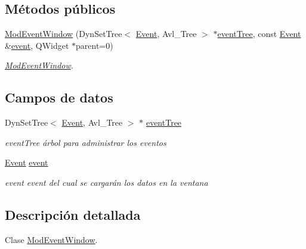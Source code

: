 \subsection*{Métodos públicos}
\begin{DoxyCompactItemize}
\item 
\hyperlink{class_mod_event_window_af4786249a6a84874d00927b9fc956f9c}{Mod\+Event\+Window} (Dyn\+Set\+Tree$<$ \hyperlink{class_event}{Event}, Avl\+\_\+\+Tree $>$ $\ast$\hyperlink{class_mod_event_window_afe17e39631e29b25a5442bfa41575dce}{event\+Tree}, const \hyperlink{class_event}{Event} \&\hyperlink{class_mod_event_window_aa6931186e1f39dafc51befc85bed2470}{event}, Q\+Widget $\ast$parent=0)
\begin{DoxyCompactList}\small\item\em \hyperlink{class_mod_event_window}{Mod\+Event\+Window}. \end{DoxyCompactList}\end{DoxyCompactItemize}
\subsection*{Campos de datos}
\begin{DoxyCompactItemize}
\item 
Dyn\+Set\+Tree$<$ \hyperlink{class_event}{Event}, Avl\+\_\+\+Tree $>$ $\ast$ \hyperlink{class_mod_event_window_afe17e39631e29b25a5442bfa41575dce}{event\+Tree}\hypertarget{class_mod_event_window_afe17e39631e29b25a5442bfa41575dce}{}\label{class_mod_event_window_afe17e39631e29b25a5442bfa41575dce}

\begin{DoxyCompactList}\small\item\em event\+Tree árbol para administrar los eventos \end{DoxyCompactList}\item 
\hyperlink{class_event}{Event} \hyperlink{class_mod_event_window_aa6931186e1f39dafc51befc85bed2470}{event}\hypertarget{class_mod_event_window_aa6931186e1f39dafc51befc85bed2470}{}\label{class_mod_event_window_aa6931186e1f39dafc51befc85bed2470}

\begin{DoxyCompactList}\small\item\em event event del cual se cargarán los datos en la ventana \end{DoxyCompactList}\end{DoxyCompactItemize}


\subsection{Descripción detallada}
Clase \hyperlink{class_mod_event_window}{Mod\+Event\+Window}. 

